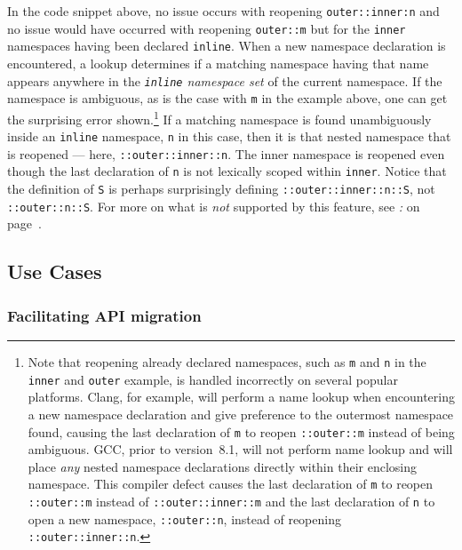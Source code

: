 \noindent In the code snippet above, no issue occurs with reopening
\texttt{outer::inner:n} and no issue would have occurred with reopening
\texttt{outer::m} but for the \texttt{inner} namespaces having been
declared \texttt{inline}. When a new namespace declaration is
encountered, a lookup determines if a matching namespace having that
name appears anywhere in the \emph{\texttt{inline} namespace set} of the
current namespace. If the namespace is ambiguous, as is the case with
\texttt{m} in the example above, one can get the surprising error shown.{\cprotect\footnote{Note that reopening already declared
namespaces, such as \texttt{m} and \texttt{n} in the \texttt{inner}
and \texttt{outer} example, is handled incorrectly on several
popular platforms. Clang, for example, will perform a name lookup when
encountering a new namespace declaration and give preference to the
outermost namespace found, causing the last declaration of \texttt{m}
to reopen \texttt{::outer::m} instead of being ambiguous. GCC, prior
to version~8.1, will not perform name lookup and will place \emph{any}
nested namespace declarations directly within their enclosing
namespace. This compiler defect causes the last declaration of
\texttt{m} to reopen \texttt{::outer::m} instead of
\texttt{::outer::inner::m} and the last declaration of \texttt{n} to
open a new namespace, \texttt{::outer::n}, instead of reopening
  \texttt{::outer::inner::n}.}} If a matching namespace is found
unambiguously inside an \texttt{inline} namespace, \texttt{n} in this
case, then it is that nested namespace that is reopened --- here,
\texttt{::outer::inner::n}. The inner namespace is reopened even though
the last declaration of \texttt{n} is not lexically scoped within
\texttt{inner}. Notice that the definition of \texttt{S} is perhaps
surprisingly defining \texttt{::outer::inner::n::S}, not
\texttt{::outer::n::S}. For more on what is \emph{not} supported by this
feature, see \textit{: } on page~\pageref{inability-to-redeclare-across-namespaces-impedes-code-factoring}.

\subsection[Use Cases]{Use Cases}\label{use-cases-inlinenamespace}

\subsubsection[Facilitating API migration]{Facilitating API migration}\label{facilitating-api-migration}

